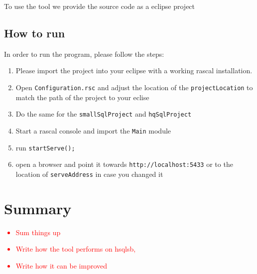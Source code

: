 \documentclass{uva-inf-article}
\newcommand\todo[1]{\textcolor{red}{#1}}
\begin{document}
To use the tool we provide the source code as a eclipse project

\subsection{How to run}

In order to run the program, please follow the steps:

\begin{enumerate}
\item
  Please import the project into your eclipse with a working rascal
  installation.
\item
  Open \texttt{Configuration.rsc} and adjust the location of the
  \texttt{projectLocation} to match the path of the project to your
  eclise
\item
  Do the same for the \texttt{smallSqlProject} and \texttt{hqSqlProject}
\item
  Start a rascal console and import the \texttt{Main} module
\item
  run \texttt{startServe();}
\item
  open a browser and point it towards \texttt{http://localhost:5433} or
  to the location of \texttt{serveAddress} in case you changed it
\end{enumerate}


\section{Summary}
\todo {
	\begin{itemize}
		\item{Sum things up}
		\item{Write how the tool performs on hsqlsb,}
		\item{Write how it can be improved}
	\end{itemize}
}




\printbibliography


\end{document}
